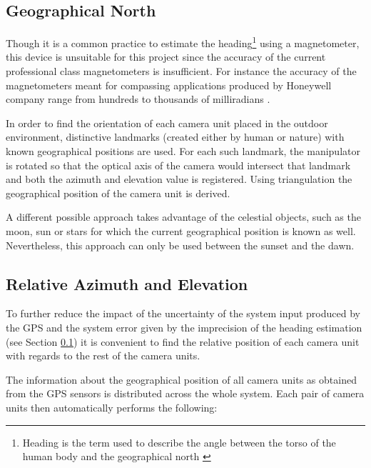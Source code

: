 \subsection{Geographical North} \label{txt:geographical_north}

Though it is a common practice to estimate the heading\footnote{Heading is the term used to describe the angle between the torso of the human body and the geographical north \cite{Henriksson648760}} using a magnetometer, this device is unsuitable for this project since the accuracy of the current professional class magnetometers is insufficient. For instance the accuracy of the magnetometers meant for compassing applications produced by Honeywell company range from hundreds to thousands of milliradians \cite{Honeywell:compassing_catalog}.

In order to find the orientation of each camera unit placed in the outdoor environment, distinctive landmarks (created either by human or nature) with known geographical positions are used. For each such landmark, the manipulator is rotated so that the optical axis of the camera would intersect that landmark and both the azimuth and elevation value is registered. Using triangulation the geographical position of the camera unit is derived. 

A different possible approach takes advantage of the celestial objects, such as the moon, sun or stars for which the current geographical position is known as well. Nevertheless, this approach can only be used between the sunset and the dawn.

\subsection{Relative Azimuth and Elevation}

To further reduce the impact of the uncertainty of the system input produced by the GPS and the system error given by the imprecision of the heading estimation (see Section \ref{txt:geographical_north}) it is convenient to find the relative position of each camera unit with regards to the rest of the camera units.

The information about the geographical position of all camera units as obtained from the GPS sensors is distributed across the whole system. Each pair of camera units then automatically performs the following:

